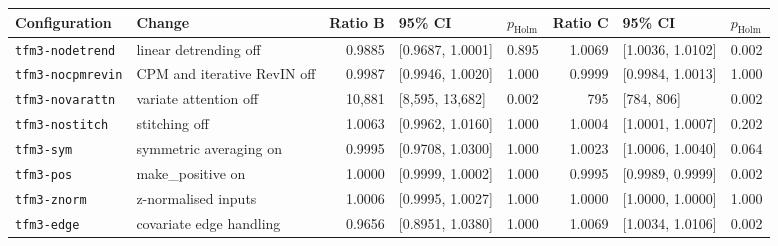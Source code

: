 \begin{tabular}{llrllrll}
\toprule
Configuration & Change & Ratio B & 95\% CI & $p_{\mathrm{Holm}}$ & Ratio C & 95\% CI & $p_{\mathrm{Holm}}$ \\
\midrule
\texttt{tfm3-nodetrend} & linear detrending off & 0.9885 & [0.9687, 1.0001] & 0.895 & 1.0069 & [1.0036, 1.0102] & 0.002 \\
\texttt{tfm3-nocpmrevin} & CPM and iterative RevIN off & 0.9987 & [0.9946, 1.0020] & 1.000 & 0.9999 & [0.9984, 1.0013] & 1.000 \\
\texttt{tfm3-novarattn} & variate attention off & 10{,}881 & [8{,}595, 13{,}682] & 0.002 & 795 & [784, 806] & 0.002 \\
\texttt{tfm3-nostitch} & stitching off & 1.0063 & [0.9962, 1.0160] & 1.000 & 1.0004 & [1.0001, 1.0007] & 0.202 \\
\texttt{tfm3-sym} & symmetric averaging on & 0.9995 & [0.9708, 1.0300] & 1.000 & 1.0023 & [1.0006, 1.0040] & 0.064 \\
\texttt{tfm3-pos} & make\_positive on & 1.0000 & [0.9999, 1.0002] & 1.000 & 0.9995 & [0.9989, 0.9999] & 0.002 \\
\texttt{tfm3-znorm} & z-normalised inputs & 1.0006 & [0.9995, 1.0027] & 1.000 & 1.0000 & [1.0000, 1.0000] & 1.000 \\
\texttt{tfm3-edge} & covariate edge handling & 0.9656 & [0.8951, 1.0380] & 1.000 & 1.0069 & [1.0034, 1.0106] & 0.002 \\
\bottomrule
\end{tabular}
